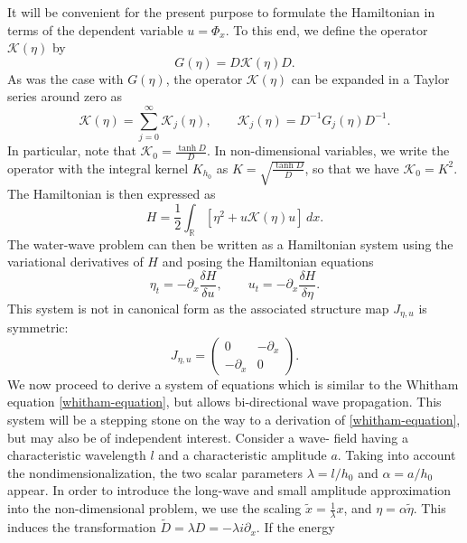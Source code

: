 It will be convenient for the present purpose to formulate the
Hamiltonian in terms of the dependent variable $u = \Phi_x$. To this
end, we define the operator $\mathcal{K} (\eta)$ by
%
\begin{equation*}
	G(\eta) = D \mathcal{K}(\eta) D
	.
\end{equation*}
%
As was the case with $G (\eta)$, the operator $\mathcal{K}(\eta)$ can be expanded in
a Taylor series around zero as
%
\[
	\mathcal{K}(\eta) = \sum_{j=0}^\infty \mathcal{K}_j(\eta)
	, \qquad
	\mathcal{K}_j(\eta) = D^{-1}G_j(\eta)D^{-1}
	.
\]
%
In particular, note that $\mathcal{K}_0 = \frac{\tanh D}{D}$. In non-dimensional variables, we write the operator with the integral kernel $K_{h_0}$ as $K = \sqrt{\frac{\tanh D}{D}}$, so that we have $\mathcal{K}_0 = K^2$. The Hamiltonian is then expressed as 
%
\begin{equation}
	H  = \frac{1}{2} \int_{\mathbb{R}} \left[ \eta^2 + u \mathcal{K}(\eta) u \right] \, dx.
	\label{scaled-Hamiltonian}
\end{equation}
%
The water-wave problem can then be written as a Hamiltonian
system using the variational derivatives of $H$ and posing the
Hamiltonian equations
%
\begin{equation}
	\eta_t = - \partial_x \frac{\delta H}{\delta u}, \qquad u_t = -\partial_x \frac{\delta H}{\delta \eta}.
\end{equation}
%
This system is not in canonical form as the associated structure
map $J_{\eta, u}$ is symmetric:
%
\begin{equation}
	J_{\eta, u} =
	\begin{pmatrix}
		0 & -\partial_x
		\\
		-\partial_x & 0
	\end{pmatrix}.
\end{equation}
%
We now proceed to derive a system of equations which is similar to
the Whitham equation \eqref{whitham-equation}, but allows bi-directional wave propagation. This system will be a stepping stone on the way to a derivation
of \eqref{whitham-equation}, but may also be of independent interest. Consider a wave-
field having a characteristic wavelength $l$ and a characteristic amplitude $a$. Taking into account the nondimensionalization, the two
scalar parameters $\lambda = l / h_0$ and $ \alpha = a / h_0$ appear. In order to introduce the long-wave and small amplitude approximation into the
non-dimensional problem, we use the scaling $\tilde{x}= \frac{1}{\lambda} x$, and $ \eta = \alpha \tilde{\eta}$.
This induces the transformation $\tilde{D} = \lambda D = -\lambda i \partial_x $. If the energy
